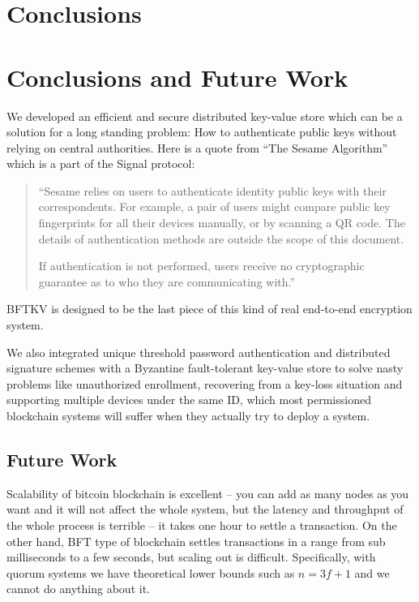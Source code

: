 \ifdefined\ABSTRACT
\section{Conclusions}
\else
\section{Conclusions and Future Work}
\fi
We developed an efficient and secure distributed key-value store which
can be a solution for a long standing problem: How to authenticate
public keys without relying on central authorities. Here is a quote
from ``The Sesame Algorithm'' \cite{signal} which is a part of the
Signal protocol:
\begin{quote}
``Sesame relies on users to authenticate identity public keys with their
correspondents. For example, a pair of users might compare public key
fingerprints for all their devices manually, or by scanning a QR
code. The details of authentication methods are outside the scope of
this document.

If authentication is not performed, users receive no cryptographic
guarantee as to who they are communicating with.''
\end{quote}
BFTKV is designed to be the last piece of this kind of real end-to-end
encryption system.

We also integrated unique threshold password authentication and
distributed signature schemes with a Byzantine fault-tolerant
key-value store to solve nasty problems like unauthorized enrollment,
recovering from a key-loss situation and supporting multiple devices
under the same ID, which most permissioned blockchain systems will
suffer when they actually try to deploy a system.

\ifdefined\ABSTRACT
\else
\subsection*{Future Work}
Scalability of bitcoin blockchain is excellent -- you can add as many
nodes as you want and it will not affect the whole system, but the
latency and throughput of the whole process is terrible -- it takes
one hour to settle a transaction.
On the other hand, BFT type of blockchain settles transactions in a
range from sub milliseconds to a few seconds, but scaling out is
difficult. Specifically, with quorum systems we have theoretical lower
bounds such as $n = 3f + 1$ and we cannot do anything about it.


